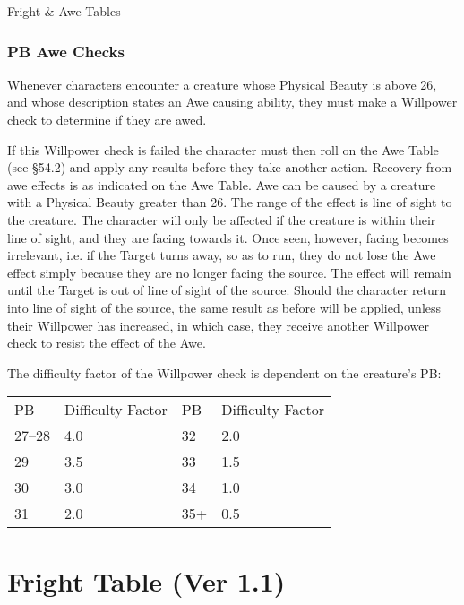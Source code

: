 \begin{Tables}{Fright \& Awe Tables}
\begin{multicols}{3}
\subsubsection{PB Awe Checks}

Whenever characters encounter a creature whose Physical Beauty is
above 26, and whose description states an Awe causing ability, they
must make a Willpower check to determine if they are awed.

If this Willpower check is failed the character must then roll on the
Awe Table (see §54.2) and apply any results before they take another
action. Recovery from awe effects is as indicated on the Awe Table.
Awe can be caused by a creature with a Physical Beauty greater than
26.  The range of the effect is line of sight to the creature. The
character will only be affected if the creature is within their line
of sight, and they are facing towards it.  Once seen, however, facing
becomes irrelevant, i.e. if the Target turns away, so as to run, they
do not lose the Awe effect simply because they are no longer facing
the source.  The effect will remain until the Target is out of line of
sight of the source. Should the character return into line of sight of
the source, the same result as before will be applied, unless their
Willpower has increased, in which case, they receive another Willpower
check to resist the effect of the Awe.

The difficulty factor of the Willpower check is dependent on the
creature’s PB:

\begin{tabularx}{\columnwidth}{lXlX} 
PB	& Difficulty Factor	& PB	& Difficulty  Factor \\
27–28	& 4.0			& 32	& 2.0 \\
29	& 3.5			& 33	& 1.5 \\
30	& 3.0			& 34	& 1.0 \\
31	& 2.0			& 35+	& 0.5 \\
\end{tabularx}

\end{multicols}

\section{Fright Table (Ver 1.1)}

\begin{multicols}{3}

\begin{Description}


\end{Description}
\end{multicols}
\end{Tables}
